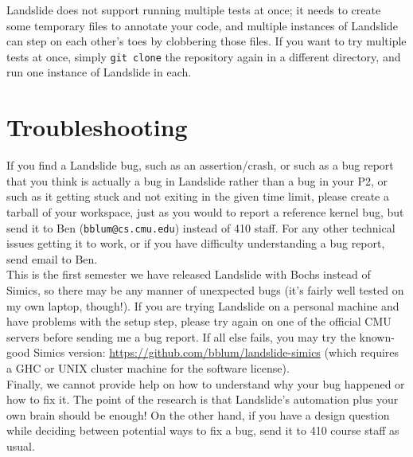 \documentclass{article}
\begin{document}
 Landslide does not support running multiple tests at once;
it needs to create some temporary files to annotate your code, and multiple instances of Landslide can step on each other's toes by clobbering those files.
If you want to try multiple tests at once, simply {\tt git clone} the repository again in a different directory, and run one instance of Landslide in each.
\\

\section{Troubleshooting}

If you find a Landslide bug, such as an assertion/crash, or such as a
bug report that you think is actually a bug in Landslide rather than a bug in your P2, or such as it getting stuck
and not exiting in the given time limit, please create a tarball of your workspace, just as you would to report
a reference kernel bug, but send it to Ben ({\tt bblum@cs.cmu.edu}) instead of 410 staff. For any other technical
issues getting it to work, or if you have difficulty understanding a bug report, send email to Ben.
\\

\noindent
This is the first semester we have released Landslide with Bochs instead of Simics,
so there may be any manner of unexpected bugs (it's fairly well tested on my own laptop, though!).
If you are trying Landslide on a personal machine and have problems with the setup step,
please try again on one of the official CMU servers before sending me a bug report.
If all else fails, you may try the known-good Simics version:
\url{https://github.com/bblum/landslide-simics}
(which requires a GHC or UNIX cluster machine for the software license).
\\

\noindent Finally, we cannot provide help on how to understand why your bug happened or how to fix it. The point of
the research is that Landslide's automation plus your own brain should be enough! On the other hand, if you have
a design question while deciding between potential ways to fix a bug, send it to 410 course staff as usual.
\end{document}
